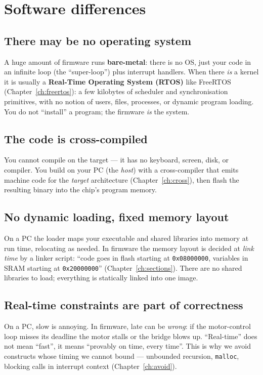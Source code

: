 \documentclass[11pt,a4paper,oneside]{book}
\newcommand{\code}[1]{\texttt{#1}}
\begin{document}
\section{Software differences}

\subsection{There may be no operating system}
A huge amount of firmware runs \textbf{bare-metal}: there is no OS, just your
code in an infinite loop (the ``super-loop'') plus interrupt handlers. When
there \emph{is} a kernel it is usually a \textbf{Real-Time Operating System
(RTOS)} like FreeRTOS (Chapter~\ref{ch:freertos}): a few kilobytes of scheduler
and synchronisation primitives, with no notion of users, files, processes, or
dynamic program loading. You do not ``install'' a program; the firmware
\emph{is} the system.

\subsection{The code is cross-compiled}
You cannot compile on the target --- it has no keyboard, screen, disk, or
compiler. You build on your PC (the \emph{host}) with a cross-compiler that
emits machine code for the \emph{target} architecture (Chapter~\ref{ch:cross}),
then flash the resulting binary into the chip's program memory.

\subsection{No dynamic loading, fixed memory layout}
On a PC the loader maps your executable and shared libraries into memory at
run time, relocating as needed. In firmware the memory layout is decided at
\emph{link time} by a linker script: ``code goes in flash starting at
\code{0x08000000}, variables in SRAM starting at \code{0x20000000}''
(Chapter~\ref{ch:sections}). There are no shared libraries to load; everything
is statically linked into one image.

\subsection{Real-time constraints are part of correctness}
On a PC, slow is annoying. In firmware, late can be \emph{wrong}: if the
motor-control loop misses its deadline the motor stalls or the bridge blows up.
``Real-time'' does not mean ``fast'', it means ``provably on time, every time''.
This is why we avoid constructs whose timing we cannot bound --- unbounded
recursion, \code{malloc}, blocking calls in interrupt context
(Chapter~\ref{ch:avoid}).
\end{document}
